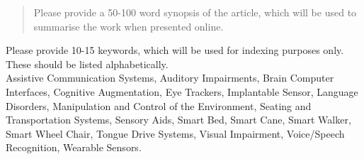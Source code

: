 \documentclass[review]{elsarticle}
\begin{document}
\begin{frontmatter}







 \begin{abstract}
Please provide a 50-100 word synopsis of the article, which will be used to summarise the work when presented online.
\end{abstract}

\begin{keyword}
Please provide 10-15 keywords, which will be used for indexing purposes only. These should be listed alphabetically.\\
Assistive Communication Systems,  Auditory Impairments, Brain Computer Interfaces, Cognitive Augmentation, Eye Trackers, Implantable Sensor, Language Disorders, Manipulation and Control of the Environment, Seating and Transportation Systems, Sensory Aids,   Smart Bed, Smart Cane, Smart Walker, Smart Wheel Chair, Tongue Drive Systems, Visual Impairment, Voice/Speech Recognition, Wearable Sensors.
\end{keyword}





\end{frontmatter}




 







\end{document}
